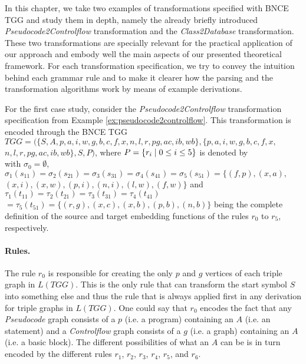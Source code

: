 In this chapter, we take two examples of transformations specified with BNCE TGG and study them in depth, namely the already briefly introduced \emph{Pseudocode2Controlflow} transformation and the \emph{Class2Database} transformation. These two transformations are specially relevant for the practical application of our approach and embody well the main aspects of our presented theoretical framework. For each transformation specification, we try to convey the intuition behind each grammar rule and to make it clearer how the parsing and the transformation algorithms work by means of example derivations.


For the first case study, consider the \emph{Pseudocode2Controlflow} transformation specification from Example \ref{ex:pseudocode2controlflow}. This transformation is encoded through the BNCE TGG $TGG = (\{S, A, p, a, i, w, g, b, c, f, x, n, l, r, pg, ac, ib, wb\}, \{p, a, i, w, g, b, c, f, x,$ $ n, l, r, pg, ac, ib, wb\}, S, P)$, where $P = \{r_i \; | \; 0 \le i \le 5\}$ is denoted by\\


\noindent
with $\sigma_0 = \emptyset$, $\sigma_1(s_{11}) = \sigma_2(s_{21}) = \sigma_3(s_{31}) = \sigma_4(s_{41}) =\sigma_5(s_{51}) = \{ (f,p), (x,a), $ $(x,i), (x,w), (p,i), (n,i), (l,w), (f,w) \}$ and $\tau_1(t_{11}) = \tau_2(t_{21}) = \tau_3(t_{31}) = \tau_4(t_{41}) $ $= \tau_5(t_{51}) = \{ (r,g), (x,c), (x,b), (p,b), (n,b)\}$ being the complete definition of the source and target embedding functions of the rules $r_0$ to $r_5$, respectively.

\paragraph*{Rules. } The rule $r_0$ is responsible for creating the only $p$ and $g$ vertices of each triple graph in $L(TGG)$. This is the only rule that can transform the start symbol $S$ into something else and thus the rule that is always applied first in any derivation for triple graphs in $L(TGG)$. One could say that $r_0$ encodes the fact that any \emph{Pseudocode} graph consists of a $p$ (i.e. a program) containing an $A$ (i.e. an statement) and a \emph{Controlflow} graph consists of a $g$ (i.e. a graph) containing an $A$ (i.e. a basic block). The different possibilities of what an $A$ can be is in turn encoded by the different rules $r_1$, $r_2$, $r_3$, $r_4$, $r_5$, and $r_6$.

